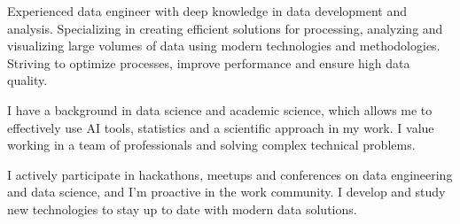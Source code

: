 

\begin{cvparagraph}

Experienced data engineer with deep knowledge in data development and analysis. Specializing in creating efficient solutions for processing, analyzing and visualizing large volumes of data using modern technologies and methodologies. Striving to optimize processes, improve performance and ensure high data quality.

I have a background in data science and academic science, which allows me to effectively use AI tools, statistics and a scientific approach in my work. I value working in a team of professionals and solving complex technical problems.

I actively participate in hackathons, meetups and conferences on data engineering and data science, and I'm proactive in the work community. I develop and study new technologies to stay up to date with modern data solutions.
\end{cvparagraph}